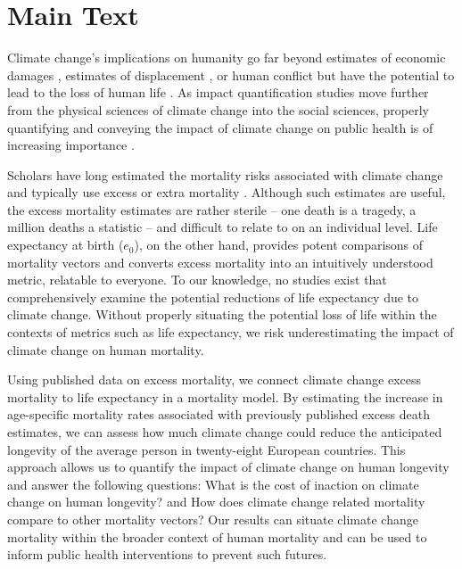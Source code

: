\documentclass[12pt,]{article}
\begin{document}
\vskip 6.5pt


\noindent \doublespacing \newpage

\section{Main Text}\label{main-text}

Climate change's implications on humanity go far beyond estimates of
economic damages \citep{hsiang2017estimating}, estimates of displacement
\citep{rigaud2018groundswell}, or human conflict
\citep{barnett2007climate} but have the potential to lead to the loss of
human life \citep{forzieri2017increasing, pachauri2014climate}. As
impact quantification studies move further from the physical sciences of
climate change into the social sciences, properly quantifying and
conveying the impact of climate change on public health is of increasing
importance \citep{melillo2014climate, cloyd2016engagement}.

Scholars have long estimated the mortality risks associated with climate
change and typically use excess or extra mortality
\citep{forzieri2017increasing, wilson2017climate, mcmichael2006climate, zanobetti2012summer}.
Although such estimates are useful, the excess mortality estimates are
rather sterile -- one death is a tragedy, a million deaths a statistic
-- and difficult to relate to on an individual level. Life expectancy at
birth (\(e_0\)), on the other hand, provides potent comparisons of
mortality vectors and converts excess mortality into an intuitively
understood metric, relatable to everyone. To our knowledge, no studies
exist that comprehensively examine the potential reductions of life
expectancy due to climate change. Without properly situating the
potential loss of life within the contexts of metrics such as life
expectancy, we risk underestimating the impact of climate change on
human mortality.

Using published data on excess mortality\citep{forzieri2017increasing},
we connect climate change excess mortality to life expectancy in a
mortality model. By estimating the increase in age-specific mortality
rates associated with previously published excess death estimates, we
can assess how much climate change could reduce the anticipated
longevity of the average person in twenty-eight European countries. This
approach allows us to quantify the impact of climate change on human
longevity and answer the following questions: What is the cost of
inaction on climate change on human longevity? and How does climate
change related mortality compare to other mortality vectors? Our results
can situate climate change mortality within the broader context of human
mortality and can be used to inform public health interventions to
prevent such futures.
\end{document}
